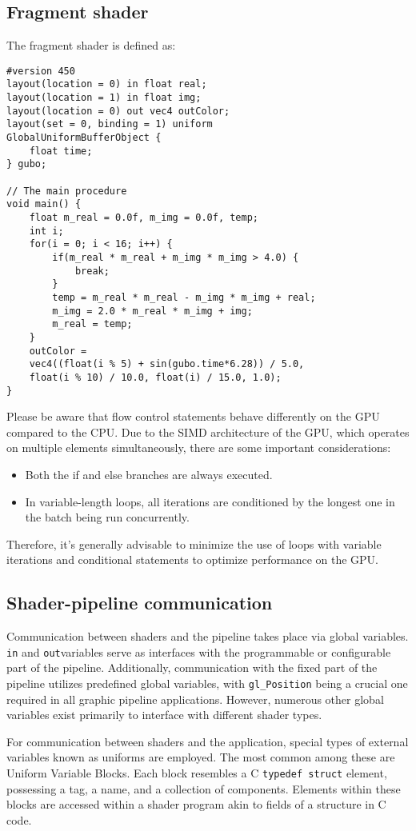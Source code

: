 \subsection{Fragment shader}
The fragment shader is defined as: 
\begin{verbatim}
#version 450
layout(location = 0) in float real;
layout(location = 1) in float img;
layout(location = 0) out vec4 outColor;
layout(set = 0, binding = 1) uniform
GlobalUniformBufferObject {
    float time;
} gubo;

// The main procedure
void main() {
    float m_real = 0.0f, m_img = 0.0f, temp;
    int i;
    for(i = 0; i < 16; i++) {
        if(m_real * m_real + m_img * m_img > 4.0) {
            break;
        }
        temp = m_real * m_real - m_img * m_img + real;
        m_img = 2.0 * m_real * m_img + img;
        m_real = temp;
    }
    outColor =
    vec4((float(i % 5) + sin(gubo.time*6.28)) / 5.0,
    float(i % 10) / 10.0, float(i) / 15.0, 1.0);
}
\end{verbatim}
Please be aware that flow control statements behave differently on the GPU compared to the CPU. 
Due to the SIMD architecture of the GPU, which operates on multiple elements simultaneously, there are some important considerations:
\begin{itemize}
    \item Both the if and else branches are always executed.
    \item In variable-length loops, all iterations are conditioned by the longest one in the batch being run concurrently.
\end{itemize}
Therefore, it's generally advisable to minimize the use of loops with variable iterations and conditional statements to optimize performance on the GPU.

\subsection{Shader-pipeline communication}
Communication between shaders and the pipeline takes place via global variables.
\texttt{in} and \texttt{out}variables serve as interfaces with the programmable or configurable part of the pipeline. 
Additionally, communication with the fixed part of the pipeline utilizes predefined global variables, with \texttt{gl\_Position} being a crucial one required in all graphic pipeline applications.
However, numerous other global variables exist primarily to interface with different shader types.

For communication between shaders and the application, special types of external variables known as uniforms are employed. 
The most common among these are Uniform Variable Blocks.
Each block resembles a C \texttt{typedef struct}  element, possessing a tag, a name, and a collection of components. 
Elements within these blocks are accessed within a shader program akin to fields of a structure in C code.